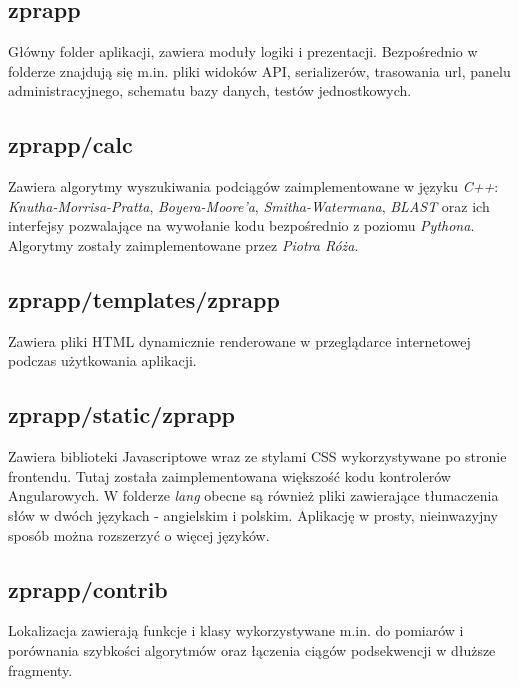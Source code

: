 \subsection*{zprapp}
Główny folder aplikacji, zawiera moduły logiki i prezentacji.
Bezpośrednio w folderze znajdują się m.in. pliki widoków API, serializerów, trasowania url, panelu administracyjnego, schematu bazy danych, testów jednostkowych.

\subsection*{zprapp/calc}
Zawiera algorytmy wyszukiwania podciągów zaimplementowane w języku \textit{C++}: \textit{Knutha-Morrisa-Pratta}, \textit{Boyera-Moore'a}, \textit{Smitha-Watermana}, \textit{BLAST} oraz ich interfejsy pozwalające na wywołanie kodu bezpośrednio z poziomu \textit{Pythona}. Algorytmy zostały zaimplementowane przez \textit{Piotra Róża}.

\subsection*{zprapp/templates/zprapp}
Zawiera pliki HTML dynamicznie renderowane w przeglądarce internetowej podczas użytkowania aplikacji.

\subsection*{zprapp/static/zprapp}
Zawiera biblioteki Javascriptowe wraz ze stylami CSS wykorzystywane po stronie frontendu.
Tutaj została zaimplementowana większość kodu kontrolerów Angularowych.
W folderze \textit{lang} obecne są również pliki zawierające tłumaczenia słów w dwóch językach - angielskim i polskim.
Aplikację w prosty, nieinwazyjny sposób można rozszerzyć o więcej języków.

\subsection*{zprapp/contrib}
Lokalizacja zawierają funkcje i klasy wykorzystywane m.in. do pomiarów i porównania szybkości algorytmów oraz łączenia ciągów podsekwencji w dłuższe fragmenty.


